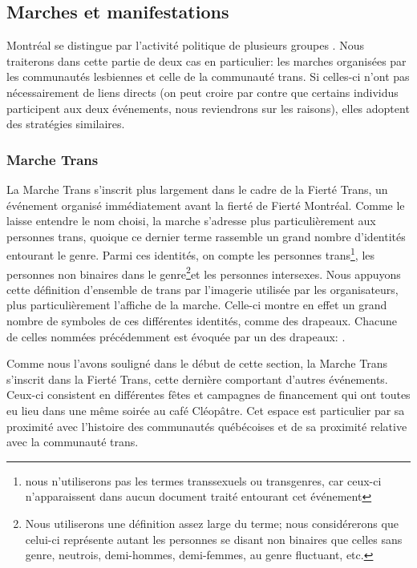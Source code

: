 \subsection{Marches et manifestations}
\label{subsec:label}
Montréal se distingue par l'activité politique de plusieurs groupes \lgbt{}.
Nous traiterons dans cette partie de deux cas en particulier: les marches organisées par les communautés lesbiennes et celle de la communauté trans.
Si celles-ci n'ont pas nécessairement de liens directs (on peut croire par contre que certains individus participent aux deux événements, nous reviendrons sur les raisons), elles adoptent des stratégies similaires.

\subsubsection{Marche Trans}
\label{subsubsec:marchetrans}
La Marche Trans s'inscrit plus largement dans le cadre de la Fierté Trans, un événement organisé immédiatement avant la fierté de Fierté Montréal.
Comme le laisse entendre le nom choisi, la marche s'adresse plus particulièrement aux personnes trans, quoique ce dernier terme rassemble un grand nombre d'identités entourant le genre.
Parmi ces identités, on compte les personnes trans\footnote{nous n'utiliserons pas les termes transsexuels ou transgenres, car ceux-ci n'apparaissent dans aucun document traité entourant cet événement}, les personnes non binaires dans le genre\footnote{Nous utiliserons une définition assez large du terme; nous considérerons que celui-ci représente autant les personnes se disant non binaires que celles sans genre, neutrois, demi-hommes, demi-femmes, au genre fluctuant, etc.\citep[see][]{Barker2015}}et les personnes intersexes.
Nous appuyons cette définition d'ensemble de trans par l'imagerie utilisée par les organisateurs, plus particulièrement l'affiche de la marche.
Celle-ci montre en effet un grand nombre de symboles de ces différentes identités, comme des drapeaux.
Chacune de celles nommées précédemment est évoquée par un des drapeaux: .

Comme nous l'avons souligné dans le début de cette section, la Marche Trans s'inscrit dans la Fierté Trans, cette dernière comportant d'autres événements.
Ceux-ci consistent en différentes fêtes et campagnes de financement qui ont toutes eu lieu dans une même soirée au café Cléopâtre.
Cet espace est particulier par sa proximité avec l'histoire des communautés \lgbt{} québécoises et de sa proximité relative avec la communauté trans.

